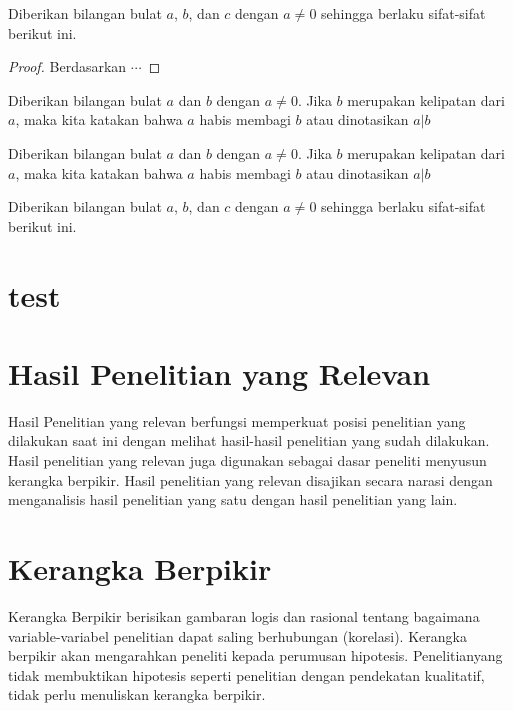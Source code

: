 	\begin{theorem}
		Diberikan bilangan bulat  $a$, $b$, dan $c$ dengan $a \neq 0$ sehingga berlaku sifat-sifat berikut ini.
	\end{theorem}
		
	\begin{proof}
		Berdasarkan $\cdots$
	\end{proof}
		
	\begin{definition}
		Diberikan bilangan bulat $a$ dan $b$ dengan $a \neq 0$. Jika $b$ merupakan kelipatan dari $a$, maka kita katakan bahwa  $a$ habis membagi $b$ atau dinotasikan $a|b$
	\end{definition}
		
	\begin{example}
		Diberikan bilangan bulat $a$ dan $b$ dengan $a \neq 0$. Jika $b$ merupakan kelipatan dari $a$, maka kita katakan bahwa  $a$ habis membagi $b$ atau dinotasikan $a|b$
	\end{example}
		
	\begin{theorem}
		Diberikan bilangan bulat  $a$, $b$, dan $c$ dengan $a \neq 0$ sehingga berlaku sifat-sifat berikut ini.
	\end{theorem}

\section{test}

		
\section{Hasil Penelitian yang Relevan}
	Hasil Penelitian yang relevan berfungsi memperkuat posisi penelitian yang dilakukan saat ini dengan melihat hasil-hasil penelitian yang sudah dilakukan. Hasil penelitian yang relevan juga digunakan sebagai dasar peneliti menyusun kerangka berpikir. Hasil penelitian yang relevan disajikan secara narasi dengan menganalisis hasil penelitian yang satu dengan hasil penelitian yang lain.
		
\section{Kerangka Berpikir}
	Kerangka Berpikir berisikan gambaran logis dan rasional tentang bagaimana variable-variabel penelitian dapat saling berhubungan (korelasi). Kerangka berpikir akan mengarahkan peneliti kepada perumusan hipotesis. Penelitianyang tidak membuktikan hipotesis seperti penelitian dengan pendekatan kualitatif, tidak perlu menuliskan kerangka berpikir.
		
